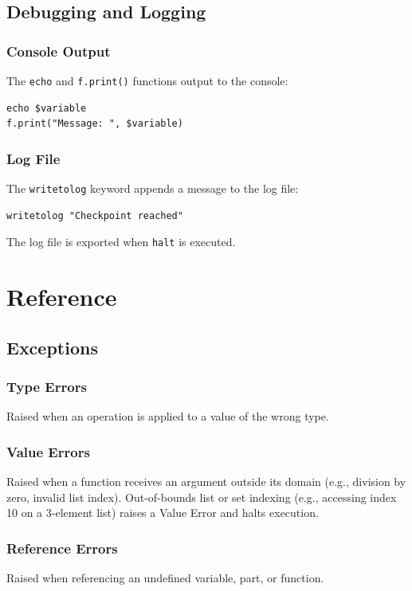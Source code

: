 \documentclass{report}
\begin{document}
\chapter{Debugging and Logging}

\section{Console Output}
The \texttt{echo} and \texttt{f.print()} functions output to the console:
\begin{verbatim}
echo $variable
f.print("Message: ", $variable)
\end{verbatim}

\section{Log File}
The \texttt{writetolog} keyword appends a message to the log file:
\begin{verbatim}
writetolog "Checkpoint reached"
\end{verbatim}
The log file is exported when \texttt{halt} is executed.




\part{Reference}
\chapter{Exceptions}

\section{Type Errors}
Raised when an operation is applied to a value of the wrong type.

\section{Value Errors}
Raised when a function receives an argument outside its domain (e.g., division by zero, invalid list index). Out-of-bounds list or set indexing (e.g., accessing index 10 on a 3-element list) raises a Value Error and halts execution.

\section{Reference Errors}
Raised when referencing an undefined variable, part, or function.
\end{document}
